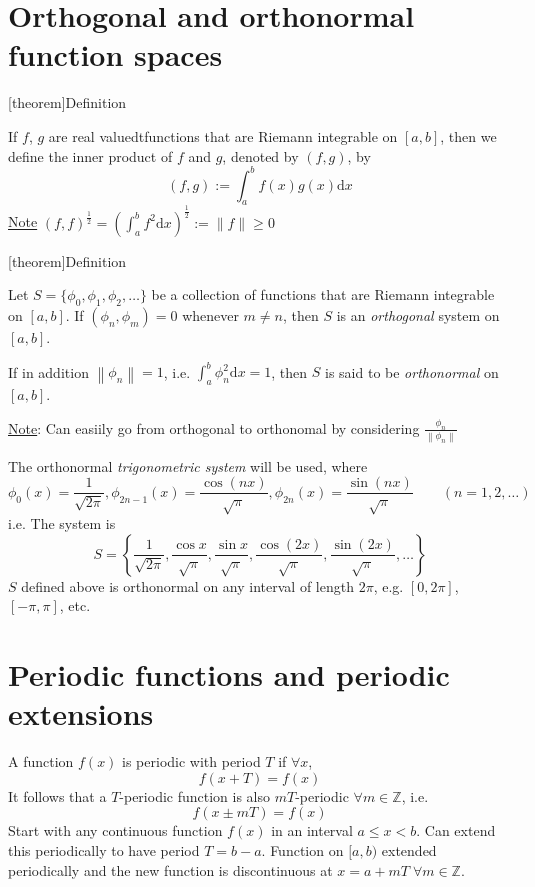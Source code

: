\documentclass[12pt]{report}
\theoremstyle{definition}
\begin{document}
\section{Orthogonal and orthonormal function spaces}
[theorem]{Definition}
\begin{inner product of f and g}
    If $f$, $g$ are real valuedtfunctions that are Riemann integrable on $[a,b]$, 
    then we define the inner product of $f$ and $g$, denoted by $(f,g)$, by \[
        (f,g) := \int_{a}^{b} f(x)g(x) \mathrm{d}x
    \]\underline{Note} ${(f,f)}^{\frac{1}{2}} = {\left(\int_{a}^{b} f^{2} \mathrm{d}x\right)}^{\frac{1}{2}} 
    := \parallel f \parallel \ge 0$
\end{inner product of f and g}
[theorem]{Definition}
\begin{orthogonal system}
    Let $S = \{\phi_0, \phi_1, \phi_2, \ldots\}$ be a collection of functions that are Riemann integrable on $[a,b]$.
    If $(\phi_n, \phi_m) = 0$ whenever $m \neq n$, then $S$ is an \emph{orthogonal} system on $[a,b]$.
    
    If in addition $\left\|\phi_n\right\| = 1$, i.e. $\int_{a}^{b} \phi_n^{2} \mathrm{d}x = 1$,
    then $S$ is said to be \emph{orthonormal} on $[a,b]$.

    \underline{Note}: Can easiily go from orthogonal to orthonomal by considering $\frac{\phi_n}{\left\|\phi_n\right\| }$
\end{orthogonal system}
The orthonormal \emph{trigonometric system} will be used, where \[
    \phi_0(x) = \frac{1}{\sqrt{2\pi}}, \phi_{2n-1}(x) = \frac{\cos{(nx)}}{\sqrt{\pi}},
    \phi_{2n}(x) = \frac{\sin{(nx)}}{\sqrt{\pi}} \qquad (n = 1,2,\ldots)
\]i.e. The system is\[
S = \left\{\frac{1}{\sqrt{2\pi}}, \frac{\cos{x}}{\sqrt{\pi}}, \frac{\sin{x}}{\sqrt{\pi}},
\frac{\cos{(2x)}}{\sqrt{\pi}}, \frac{\sin{(2x)}}{\sqrt{\pi}}, \ldots\right\}
\]
$S$ defined above is orthonormal on any interval of length $2\pi$, e.g. $[0,2\pi]$, $[-\pi,\pi]$, etc.


\section{Periodic functions and periodic extensions}
A function $f(x)$ is periodic with period $T$ if $\forall x$,\[
    f(x + T) = f(x)
\]It follows that a $T$-periodic function is also $mT$-periodic $\forall m \in \mathbb{Z}$, i.e.\[
f(x \pm mT) = f(x)
\]
Start with any continuous function $f(x)$ in an interval $a \le x < b$. 
Can extend this periodically to have period $T = b - a$.
Function on $[a,b)$ extended periodically and the new function is discontinuous at %
$x = a + mT \;\forall m \in \mathbb{Z}$.
\end{document}
